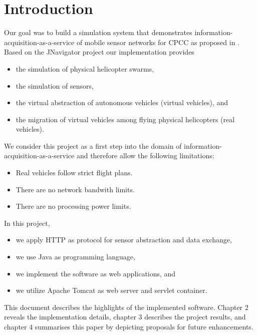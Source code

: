 
\chapter{Introduction}

Our goal was to build a simulation system that demonstrates information-acquisition-as-a-service
of mobile sensor networks for \ac{CPCC} as proposed in \cite{HotCloud10}.
Based on the JNavigator project \cite{CKrainer2009} our implementation provides
\begin{itemize}
	\item the simulation of physical helicopter swarms,
	\item the simulation of sensors,
	\item the virtual abstraction of autonomous vehicles (virtual vehicles), and
	\item the migration of virtual vehicles among flying physical helicopters (real vehicles).
\end{itemize} 

We consider this project as a first step into the domain of information-acquisition-as-a-service
and therefore allow the following limitations:
\begin{itemize}
	\item Real vehicles follow strict flight plans.
	\item There are no network bandwith limits.
	\item There are no processing power limits.
\end{itemize} 


In this project,
\begin{itemize}
	\item we apply HTTP as protocol for sensor abstraction and data exchange,
	\item we use Java as programming language,
	\item we implement the software as web applications, and
	\item we utilize Apache Tomcat as web server and servlet container.
\end{itemize} 

This document describes the highlights of the implemented software.
Chapter 2 reveals the implementation details,
chapter 3 describes the project results,
and chapter 4 summarises this paper by depicting proposals for future enhancements.
